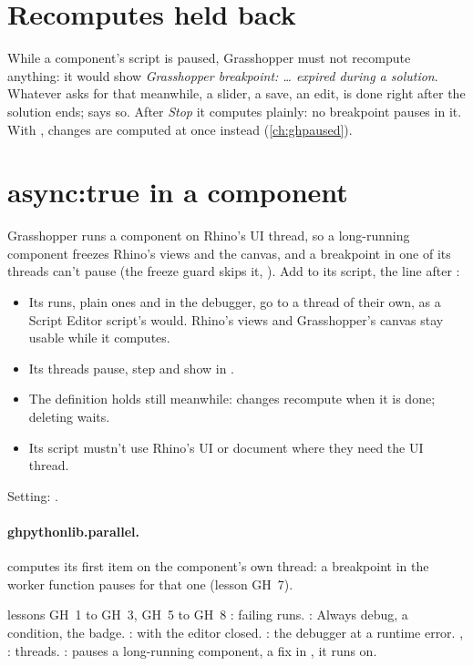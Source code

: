 \section{Recomputes held back}\label{sec:ghheld}

While a component's script is paused, Grasshopper must not recompute anything: it would show
\emph{Grasshopper breakpoint: … expired during a solution}. Whatever asks for that meanwhile, a slider, a save,
an edit, is done right after the solution ends;  says so. After \emph{Stop} it computes plainly: no
breakpoint pauses in it. With
, changes are computed at once instead (\cref{ch:ghpaused}).

\section{async:true in a component}\label{sec:ghasync}

Grasshopper runs a component on Rhino's UI thread, so a long-running component freezes Rhino's views and the
canvas, and a breakpoint in one of its threads can't pause (the freeze guard skips it, ).
Add  to its script, the line after :

\begin{itemize}
  \item Its runs, plain ones and in the debugger, go to a thread of their own, as a Script Editor script's would.
        Rhino's views and Grasshopper's canvas stay usable while it computes.
  \item Its threads pause, step and show in .
  \item The definition holds still meanwhile: changes recompute when it is done; deleting waits.
  \item Its script mustn't use Rhino's UI or document where they need the UI thread.
\end{itemize}

Setting: .

\paragraph{ghpythonlib.parallel.}  computes its first item on the component's own thread: a
breakpoint in the worker function pauses for that one (lesson GH~7).

\begin{lesson}{lessons GH~1 to GH~3, GH~5 to GH~8}
: failing runs. : Always debug, a condition,
the badge. :  with the editor closed. : the
debugger at a runtime error. , : threads.
:  pauses a long-running component, a fix in , it runs on.
\end{lesson}
